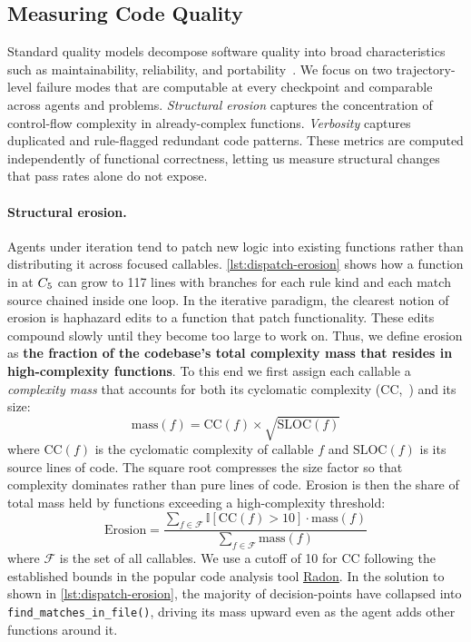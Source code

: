 \subsection{Measuring Code Quality}\label{sec:quality-dims}

Standard quality models decompose software quality into broad characteristics such as
maintainability, reliability, and portability~\citep{iso25010}. We focus on two
trajectory-level failure modes that are computable at every checkpoint and comparable
across agents and problems. \emph{Structural erosion} captures the concentration of
control-flow complexity in already-complex functions. \emph{Verbosity} captures
duplicated and rule-flagged redundant code patterns. These metrics are computed
independently of functional correctness, letting us measure structural changes that
pass rates alone do not expose.

\paragraph{Structural erosion.} Agents under iteration tend to patch new logic into existing functions rather than distributing it across focused callables. \autoref{lst:dispatch-erosion} shows how a function in \codesearch{} at $C_{5}$ can grow to 117 lines with branches for each rule kind and each match source chained inside one loop. In the iterative paradigm, the clearest notion of erosion is haphazard edits to a function that patch functionality. These edits compound slowly until they become too large to work on. Thus, we define erosion as \textbf{the fraction of the codebase's total complexity mass that resides in high-complexity functions}. To this end we first assign each callable a \emph{complexity mass} that accounts for both its cyclomatic complexity (CC,~\citep{mccabe1976-complexity}) and its size:
\begin{equation}
\label{eq:mass} 
\text{mass}(f) = \text{CC}(f) \times \sqrt{\text{SLOC}(f)}
\end{equation}
where $\text{CC}(f)$ is the cyclomatic complexity of callable $f$ and $\text{SLOC}(f)$ is its source lines of code. The square root compresses the size factor so that complexity dominates rather than pure lines of code. Erosion is then the share of total mass held by functions exceeding a high-complexity threshold:
\begin{equation}
\label{eq:erosion}
\text{Erosion}
=  \frac{\sum_{f \in \mathcal{F}} \mathbb{I}[\text{CC}(f) > 10]\cdot\text{mass}(f)}{\sum_{f \in \mathcal{F}} \text{mass}(f)}
\end{equation}
where $\mathcal{F}$ is the set of all callables. We use a cutoff of 10 for CC following the established bounds in the popular code analysis tool \href{https://radon.readthedocs.io/en/latest/}{Radon}. In the solution to \codesearch{} shown in \autoref{lst:dispatch-erosion}, the majority of decision-points have collapsed into \texttt{find\_matches\_in\_file()}, driving its mass upward even as the agent adds other functions around it.

